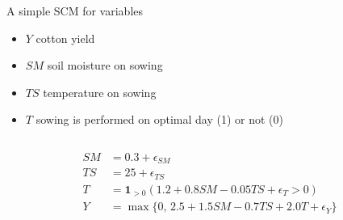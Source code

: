 \documentclass{beamer}
\begin{document}
\begin{frame}
  \begin{example}
    \begin{columns}
      \begin{column}{0.45\textwidth}
    A simple SCM for variables 
    \begin{itemize}
      \item $Y$ cotton yield  
      \item $SM$ soil moisture on sowing 
      \item $TS$ temperature on sowing 
      \item $T$ sowing is performed on optimal day (1)  or not (0)  
    \end{itemize}
      \end{column}
      \begin{column}{0.45\textwidth}

      \end{column}
    \end{columns}

    \begin{align*}
    SM &= 0.3 + \epsilon_{SM} \\
    TS &= 25 + \epsilon_{TS} \\
      T  &= \mathbf{1}_{>0} \left( 1.2 + 0.8 SM - 0.05 TS + \epsilon_T > 0 \right) \\
      Y  &= \max\{0, \, 2.5 + 1.5 SM - 0.7 TS + 2.0 T + \epsilon_Y\} 
\end{align*}
  \end{example}
\end{frame}
\end{document}
